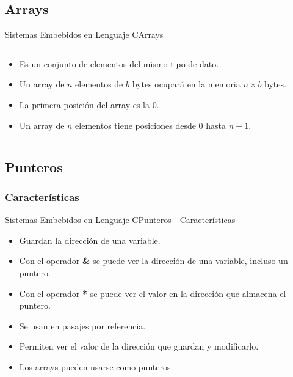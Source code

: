 \documentclass[aspectratio=169, xcolor=dvipsnames]{beamer}
\begin{document}
\subsection{Arrays}
\begin{frame}{Sistemas Embebidos en Lenguaje C}{Arrays}
\begin{columns}
    \begin{column}{0.5\textwidth}
        \begin{itemize}
            \item Es un conjunto de elementos del mismo tipo de dato.
            \item Un array de $n$ elementos de $b$ bytes ocupará en la memoria $n \times b$ bytes.
            \item La primera posición del array es la 0.
            \item Un array de $n$ elementos tiene posiciones desde 0 hasta $n - 1$.
        \end{itemize}
    \end{column}
    \begin{column}{0.5\textwidth}
        
    \end{column}
\end{columns}
\end{frame}

\subsection{Punteros}
\subsubsection{Características}
\begin{frame}{Sistemas Embebidos en Lenguaje C}{Punteros - Características}
\begin{itemize}
    \item Guardan la dirección de una variable.
    \item Con el operador \textbf{\&} se puede ver la dirección de una variable, incluso un puntero.
    \item Con el operador \textbf{*} se puede ver el valor en la dirección que almacena el puntero.
    \item Se usan en pasajes por referencia.
    \item Permiten ver el valor de la dirección que guardan y modificarlo.
    \item Los arrays pueden usarse como punteros.
\end{itemize}
\end{frame}
\end{document}
